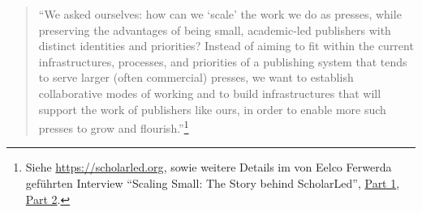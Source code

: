 \documentclass[a4paper,
fontsize=11pt,
oneside,
numbers=noperiodatend,
parskip=half-,
bibliography=totoc,
final
]{scrartcl}
\begin{document}
\begin{quote}
\enquote{We asked ourselves: how can we \enquote*{scale} the work we do
as presses, while preserving the advantages of being small, academic-led
publishers with distinct identities and priorities? Instead of aiming to
fit within the current infrastructures, processes, and priorities of a
publishing system that tends to serve larger (often commercial) presses,
we want to establish collaborative modes of working and to build
infrastructures that will support the work of publishers like ours, in
order to enable more such presses to grow and flourish.}\footnote{Siehe
  \url{https://scholarled.org}, sowie weitere Details im von Eelco
  Ferwerda geführten Interview \enquote{Scaling Small: The Story behind
  ScholarLed}, \href{https://oapen.hypotheses.org/93}{Part 1},
  \href{https://oapen.hypotheses.org/99}{Part 2}.}
\end{quote}
\end{document}
